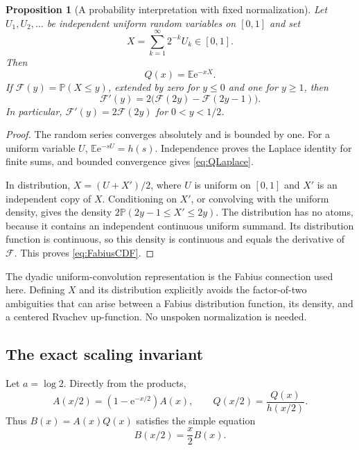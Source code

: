 \documentclass[11pt,oneside]{article}
\numberwithin{equation}{section}
\newtheorem{proposition}[theorem]{Proposition}
\theoremstyle{definition}
\theoremstyle{remark}
\newcommand{\e}{\mathrm e}
\begin{document}
\begin{proposition}[A probability interpretation with fixed normalization]
\label{prop:probability}
Let \(U_1,U_2,\ldots\) be independent uniform random variables on \([0,1]\)
and set
\begin{equation}
 X=\sum_{k=1}^{\infty}2^{-k}U_k\in[0,1].
 \label{eq:randomX}
\end{equation}
Then
\begin{equation}
 Q(x)=\mathbb E\e^{-xX}.
 \label{eq:QLaplace}
\end{equation}
If \(\mathcal F(y)=\mathbb P(X\le y)\), extended by zero for \(y\le0\)
and one for \(y\ge1\), then
\begin{equation}
 \mathcal F'(y)=2\bigl(\mathcal F(2y)-\mathcal F(2y-1)\bigr).
 \label{eq:FabiusCDF}
\end{equation}
In particular, \(\mathcal F'(y)=2\mathcal F(2y)\) for \(0<y<1/2\).
\end{proposition}
\begin{proof}
The random series converges absolutely and is bounded by one. For a uniform
variable \(U\), \(\mathbb E\e^{-sU}=h(s)\). Independence proves the Laplace
identity for finite sums, and bounded convergence gives \eqref{eq:QLaplace}.

In distribution, \(X=(U+X')/2\), where \(U\) is uniform on \([0,1]\) and
\(X'\) is an independent copy of \(X\). Conditioning on \(X'\), or convolving
with the uniform density, gives the density
\(2\mathbb P(2y-1\le X'\le2y)\). The distribution has no atoms, because it
contains an independent continuous uniform summand. Its distribution function
is continuous, so this density is continuous and equals the derivative of
\(\mathcal F\). This proves \eqref{eq:FabiusCDF}.
\end{proof}

The dyadic uniform-convolution representation is the Fabius connection used
here. Defining \(X\) and its distribution explicitly avoids the factor-of-two
ambiguities that can arise between a Fabius distribution function, its density,
and a centered Rvachev up-function. No unspoken normalization is needed.

\subsection{The exact scaling invariant}
Let \(a=\log2\). Directly from the products,
\begin{equation}
 A(x/2)=(1-\e^{-x/2})A(x),\qquad
 Q(x/2)=\frac{Q(x)}{h(x/2)}.
 \label{eq:AQscale}
\end{equation}
Thus \(B(x)=A(x)Q(x)\) satisfies the simple equation
\begin{equation}
 B(x/2)=\frac x2 B(x).
 \label{eq:Bscale}
\end{equation}
\end{document}
